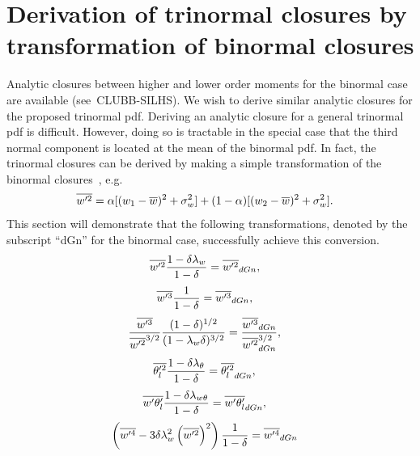 \section{Derivation of trinormal closures by transformation of binormal closures}
\label{sec:derivation-of-trinormal-closures-by-transformation-of-binormal-closures}

Analytic closures between higher and lower order moments for the binormal case
are available (see~CLUBB-SILHS\autocite{larson2022clubbsilhs}).
We wish to derive similar analytic closures for the proposed trinormal \gls{pdf}.
Deriving an analytic closure for a general trinormal \gls{pdf} is difficult.
However, doing so is tractable in the special case that the third normal component
is located at the mean of the binormal \gls{pdf}.
In fact, the trinormal closures can be derived
by making a simple transformation of the binormal closures~\cite{larson2005using},
e.g.
\begin{align}
    \label{eq:wp2_bar_dGn}
    \overline{w'^2}
    &= \alpha [(w_1 - \overline{w})^2 + \sigma_w^2]
    + (1 - \alpha) [(w_2 - \overline{w})^2 + \sigma_w^2].
\end{align}
This section will demonstrate that the following transformations,
denoted by the subscript \enquote{dGn} for the binormal case,
successfully achieve this conversion.
\begin{align}
    \label{eq:w_prime_2_transform}
    \overline{w'^2} \frac{1 - \delta\lambda_w}{1 - \delta}
    &= \overline{w'^2}_{dGn},
\end{align}
\begin{align}
    \label{eq:w_prime_3_transform}
    \overline{w'^3} \frac{1}{1 - \delta}
    &= \overline{w'^3}_{dGn},
\end{align}
\begin{align}
    \label{eq:w_prime_3_div_w_prime_2_transform}
    \frac{\overline{w'^3}}{\overline{w'^2}^{3/2}} \frac{(1 - \delta)^{1/2}}{(1 - \lambda_w\delta)^{3/2}}
    &= \frac{\overline{w'^3}_{dGn}}{\overline{w'^2}_{dGn}^{3/2}},
\end{align}
\begin{align}
    \label{eq:theta_l_prime_transform}
    \overline{\theta_l'^2} \frac{1 - \delta\lambda_\theta}{1 - \delta}
    &= \overline{\theta_l'^2}_{dGn},
\end{align}
\begin{align}
    \label{eq:w_prime_theta_l_prime_transform}
    \overline{w' \theta_l'} \frac{1 - \delta\lambda_{w\theta}}{1 - \delta}
    &= \overline{w' \theta_l'}_{dGn},
\end{align}
\begin{align}
    \label{eq:w_prime_4_transform}
    \left(\overline{w'^4} - 3\delta\lambda_w^2 \left(\overline{w'^2}\right)^2\right) \frac{1}{1 - \delta}
    &= \overline{w'^4}_{dGn}
\end{align}

